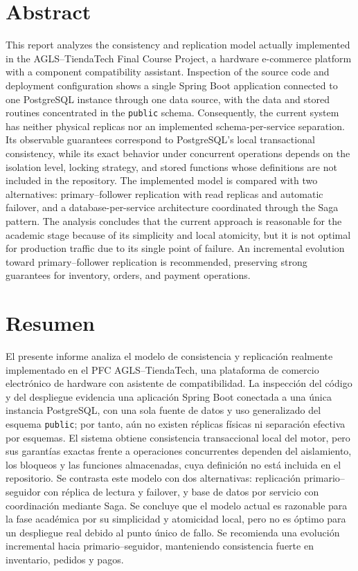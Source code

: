 \documentclass[11pt,a4paper]{article}
\begin{document}
\section*{Abstract}
This report analyzes the consistency and replication model actually implemented in the AGLS--TiendaTech Final Course Project, a hardware e-commerce platform with a component compatibility assistant. Inspection of the source code and deployment configuration shows a single Spring Boot application connected to one PostgreSQL instance through one data source, with the data and stored routines concentrated in the \texttt{public} schema. Consequently, the current system has neither physical replicas nor an implemented schema-per-service separation. Its observable guarantees correspond to PostgreSQL's local transactional consistency, while its exact behavior under concurrent operations depends on the isolation level, locking strategy, and stored functions whose definitions are not included in the repository. The implemented model is compared with two alternatives: primary--follower replication with read replicas and automatic failover, and a database-per-service architecture coordinated through the Saga pattern. The analysis concludes that the current approach is reasonable for the academic stage because of its simplicity and local atomicity, but it is not optimal for production traffic due to its single point of failure. An incremental evolution toward primary--follower replication is recommended, preserving strong guarantees for inventory, orders, and payment operations.

\section*{Resumen}
El presente informe analiza el modelo de consistencia y replicación realmente implementado en el PFC AGLS--TiendaTech, una plataforma de comercio electrónico de hardware con asistente de compatibilidad. La inspección del código y del despliegue evidencia una aplicación Spring Boot conectada a una única instancia PostgreSQL, con una sola fuente de datos y uso generalizado del esquema \texttt{public}; por tanto, aún no existen réplicas físicas ni separación efectiva por esquemas. El sistema obtiene consistencia transaccional local del motor, pero sus garantías exactas frente a operaciones concurrentes dependen del aislamiento, los bloqueos y las funciones almacenadas, cuya definición no está incluida en el repositorio. Se contrasta este modelo con dos alternativas: replicación primario--seguidor con réplica de lectura y failover, y base de datos por servicio con coordinación mediante Saga. Se concluye que el modelo actual es razonable para la fase académica por su simplicidad y atomicidad local, pero no es óptimo para un despliegue real debido al punto único de fallo. Se recomienda una evolución incremental hacia primario--seguidor, manteniendo consistencia fuerte en inventario, pedidos y pagos.
\end{document}
